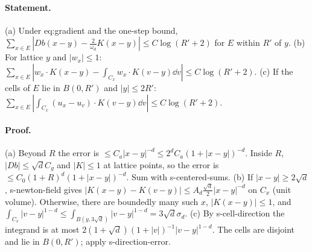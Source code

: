 \paragraph{Statement.} (a) Under eq:gradient and the one-step bound, $\sum_{x\in E}|Db(x-y)-\frac2{\omega_d}K(x-y)|\leq C\log(R'+2)$ for $E$ within $R'$ of $y$.
(b) For lattice $y$ and $|w_x|\leq1$: $\sum_{x\in E}|w_x\cdot K(x-y)-\int_{C_x}w_x\cdot K(v-y)\dd v|\leq C\log(R'+2)$. (c) If the cells of $E$ lie in $B(0,R')$
and $|y|\leq2R'$: $\sum_{x\in E}|\int_{C_x}(u_x-u_v)\cdot K(v-y)\dd v|\leq C\log(R'+2)$.
\paragraph{Proof.} (a) Beyond $R$ the error is $\leq C_a|x-y|^{-d}\leq2^dC_a(1+|x-y|)^{-d}$. Inside $R$, $|Db|\leq\sqrt dC_g$ and $|K|\leq1$ at lattice points,
so the error is $\leq C_0(1+R)^d(1+|x-y|)^{-d}$. Sum with s-centered-sums. (b) If $|x-y|\geq2\sqrt d$, s-newton-field gives
$|K(x-y)-K(v-y)|\leq A_d\frac{\sqrt d}2|x-y|^{-d}$ on $C_x$ (unit volume). Otherwise, there are boundedly many such $x$, $|K(x-y)|\leq1$, and
$\int_{C_x}|v-y|^{1-d}\leq\int_{B(y,3\sqrt d)}|v-y|^{1-d}=3\sqrt d\sigma_d$. (c) By s-cell-direction the integrand is at most
$2(1+\sqrt d)(1+|v|)^{-1}|v-y|^{1-d}$. The cells are disjoint and lie in $B(0,R')$; apply s-direction-error.
